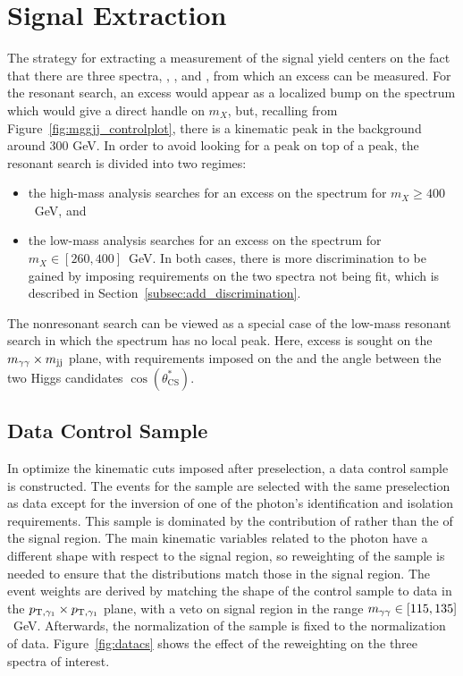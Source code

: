 \section{Signal Extraction\label{sec:extraction}}

The strategy for extracting a measurement of the signal yield centers on the fact that there
are three spectra, \Mgg, \Mjj, and \Mggjjk, from which an excess can be measured.
For the resonant search, an excess would appear as a localized bump on the
\Mggjjk spectrum which would give a direct handle on $m_X$,
but, recalling from Figure~\ref{fig:mggjj_controlplot}, there is a kinematic peak in the background
around 300 GeV. In order to avoid looking for a peak on top of a peak, the resonant search is
divided into two regimes:
\begin{itemize}
\item the high-mass analysis searches for an excess on the \Mggjjk spectrum for $m_X \ge 400$~GeV, and
\item the low-mass analysis searches for an excess on the \Mgg spectrum for $m_X \in [260, 400]$~GeV.
In both cases, there is more discrimination to be gained by imposing requirements on the two spectra
not being fit, which is described in Section~\ref{subsec:add_discrimination}.
\end{itemize}

The nonresonant search can be viewed as a special case of the low-mass resonant search in which
the \Mggjjk spectrum has no local peak. Here, excess is sought on the $m_{\gamma\gamma} \times m_{\rm jj}$ plane,
with requirements imposed on the \Mggjj and the angle between the two Higgs candidates
$\cos(\theta^*_\text{CS})$. 

\subsection{Data Control Sample\label{subsec:dataCS}}

In optimize the kinematic cuts imposed after preselection, a data control sample is constructed.
The events for the sample are selected with the same preselection as data except for
the inversion of one of the photon's identification and isolation requirements. This sample
is dominated by the contribution of \gjjj rather than the \ggjj of the signal region.
The main kinematic variables related to the photon have a different shape with respect to the
signal region, so reweighting of the sample is needed to ensure that the distributions
match those in the signal region. The event weights are derived by matching the shape
of the control sample to data in the $p_{{\rm T},\gamma_1} \times p_{{\rm T},\gamma_1}$ plane,
with a veto on signal region in the range $m_{\gamma\gamma} \in [115, 135]$~GeV. Afterwards,
the normalization of the sample is fixed to the normalization of data. Figure~\ref{fig:datacs}
shows the effect of the reweighting on the three spectra of interest.

